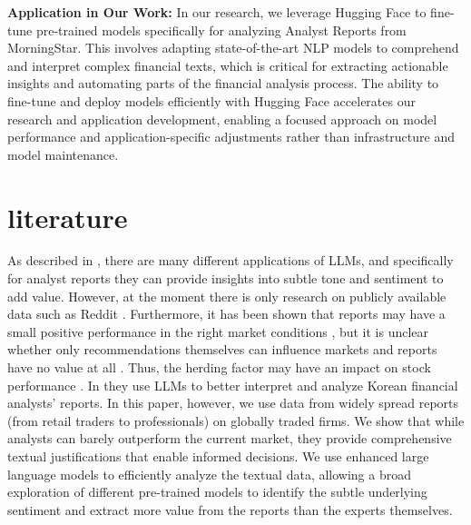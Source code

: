 \documentclass[conference]{IEEEtran}
\begin{document}
\textbf{Application in Our Work:} In our research, we leverage Hugging Face to fine-tune pre-trained models specifically for analyzing Analyst Reports from MorningStar. This involves adapting state-of-the-art NLP models to comprehend and interpret complex financial texts, which is critical for extracting actionable insights and automating parts of the financial analysis process. The ability to fine-tune and deploy models efficiently with Hugging Face accelerates our research and application development, enabling a focused approach on model performance and application-specific adjustments rather than infrastructure and model maintenance.

\section{literature}%

As described in \cite{Zhao2024}, there are many different applications of LLMs, and specifically for analyst reports they can provide insights into subtle tone and sentiment to add value. However, at the moment there is only research on publicly available data such as Reddit \cite{Deng2023}. Furthermore, it has been shown that reports may have a small positive performance in the right market conditions \cite{Su2020}, but it is unclear whether only recommendations themselves can influence markets \cite{Brauer2018} and reports have no value at all \cite{Panchenko2007}. Thus, the herding factor may have an impact on stock performance \cite{Palmer2018}.
In \cite{Kim2023} they use LLMs to better interpret and analyze Korean financial analysts' reports.
In this paper, however, we use data from widely spread reports (from retail traders to professionals) on globally traded firms. We show that while analysts can barely outperform the current market, they provide comprehensive textual justifications that enable informed decisions. We use enhanced large language models to efficiently analyze the textual data, allowing a broad exploration of different pre-trained models to identify the subtle underlying sentiment and extract more value from the reports than the experts themselves.
\end{document}
